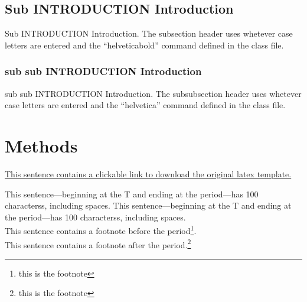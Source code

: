 \documentclass[utf8]{FrontiersinVancouver}   %
\begin{document}
\subsection{Sub INTRODUCTION Introduction}\label{} %

Sub INTRODUCTION Introduction. The subsection header uses whetever case letters are entered and the
``helveticabold'' command defined in the class file.

\subsubsection{sub sub INTRODUCTION Introduction}\label{} %

sub sub INTRODUCTION Introduction. The subsubsection header uses whetever case letters are entered
and the ``helvetica'' command defined in the class file.


\section{Methods}\label{methods}

\href{https://www.frontiersin.org/design/zip/Frontiers_LaTeX_Templates.zip}{This sentence contains a clickable link to download the original latex template.}

This sentence---beginning at the T and ending at the period---has 100 characterss, including spaces.
This sentence---beginning at the T and ending at the period---has 100 characterss, including spaces.\\
This sentence contains a footnote before the period\footnote{this is the footnote}.\\
This sentence contains a footnote after the period.\footnote{this is the footnote}

\end{document}
